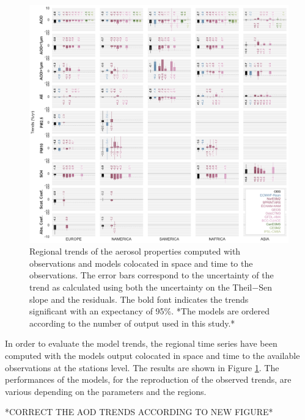 \documentclass[journal abbreviation, manuscript]{copernicus}
\begin{document}
\begin{figure}[t]
 \includegraphics[width=16cm]{../scripts/figs/heatmaps/BARS.png}
 \caption{Regional trends of the aerosol properties computed with observations and models colocated in space and time to the observations. The error bars correspond to the uncertainty of the trend as calculated using both the uncertainty on the Theil−Sen slope and the residuals. The bold font indicates the trends significant with an expectancy of 95\%. *The models are ordered according to the number of output used in this study.*}
 \label{fig:bars}
\end{figure}

In order to evaluate the model trends, the regional time series have been computed with the models output colocated in space and time to the available observations at the stations level. The results are shown in Figure \ref{fig:bars}. The performances of the models, for the reproduction of the observed trends, are various depending on the parameters and the regions.

*CORRECT THE AOD TRENDS ACCORDING TO NEW FIGURE*
\end{document}
